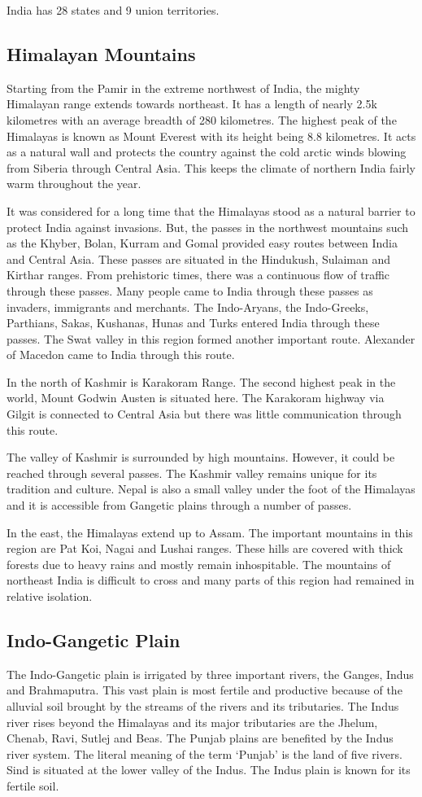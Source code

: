 \documentclass[8pt, a4paper, oneside, twocolumn]{extarticle}
\begin{document}
India has 28 states and 9 union territories.

\subsection{Himalayan Mountains}
Starting from the Pamir in the extreme northwest of India, the mighty Himalayan range extends towards northeast. It has a length of nearly 2.5k kilometres with an average breadth of 280 kilometres. The highest peak of the Himalayas is known as Mount Everest with its height being 8.8 kilometres. It acts as a natural wall and protects the country against the cold arctic winds blowing from Siberia through Central Asia. This keeps the climate of northern India fairly warm throughout the year.

It was considered for a long time that the Himalayas stood as a natural barrier to protect India against invasions. But, the passes in the northwest mountains such as the Khyber, Bolan, Kurram and Gomal provided easy routes between India and Central Asia. These passes are situated in the Hindukush, Sulaiman and Kirthar ranges. From prehistoric times, there was a continuous flow of traffic through these passes. Many people came to India through these passes as invaders, immigrants and merchants. The Indo-Aryans, the Indo-Greeks, Parthians, Sakas, Kushanas, Hunas and Turks entered India through these passes. The Swat valley in this region formed another important route. Alexander of Macedon came to India through this route.

In the north of Kashmir is Karakoram Range. The second highest peak in the world, Mount Godwin Austen is situated here. The Karakoram highway via Gilgit is connected to Central Asia but there was little communication through this route.

The valley of Kashmir is surrounded by high mountains. However, it could be reached through several passes. The Kashmir valley remains unique for its tradition and culture. Nepal is also a small valley under the foot of the Himalayas and it is accessible from Gangetic plains through a number of passes.

In the east, the Himalayas extend up to Assam. The important mountains in this region are Pat Koi, Nagai and Lushai ranges. These hills are covered with thick forests due to heavy rains and mostly remain inhospitable. The mountains of northeast India is difficult to cross and many parts of this region had remained in relative isolation.

\subsection{Indo-Gangetic Plain}
The Indo-Gangetic plain is irrigated by three important rivers, the Ganges, Indus and Brahmaputra. This vast plain is most fertile and productive because of the alluvial soil brought by the streams of the rivers and its tributaries. The Indus river rises beyond the Himalayas and its major tributaries are the Jhelum, Chenab, Ravi, Sutlej and Beas. The Punjab plains are benefited by the Indus river system. The literal meaning of the term ‘Punjab’ is the land of five rivers. Sind is situated at the lower valley of the Indus. The Indus plain is known for its fertile soil.
\end{document}
